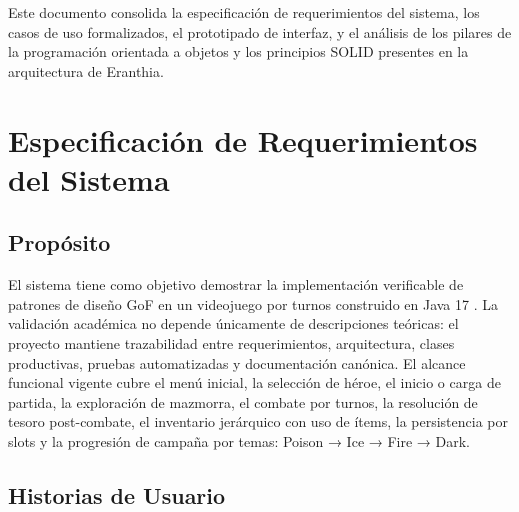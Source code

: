 \documentclass[stu,12pt,floatsintext]{apa7}
\begin{document}
Este documento consolida la especificación de requerimientos del sistema, los casos de uso formalizados, el prototipado de interfaz, y el análisis de los pilares de la programación orientada a objetos y los principios SOLID presentes en la arquitectura de Eranthia.


\section{Especificación de Requerimientos del Sistema}

\subsection{Propósito}

El sistema tiene como objetivo demostrar la implementación verificable de patrones de diseño GoF en un videojuego por turnos construido en Java 17 \cite{oracle2021}. La validación académica no depende únicamente de descripciones teóricas: el proyecto mantiene trazabilidad entre requerimientos, arquitectura, clases productivas, pruebas automatizadas y documentación canónica. El alcance funcional vigente cubre el menú inicial, la selección de héroe, el inicio o carga de partida, la exploración de mazmorra, el combate por turnos, la resolución de tesoro post-combate, el inventario jerárquico con uso de ítems, la persistencia por slots y la progresión de campaña por temas: Poison → Ice → Fire → Dark.


\subsection{Historias de Usuario}
\end{document}
